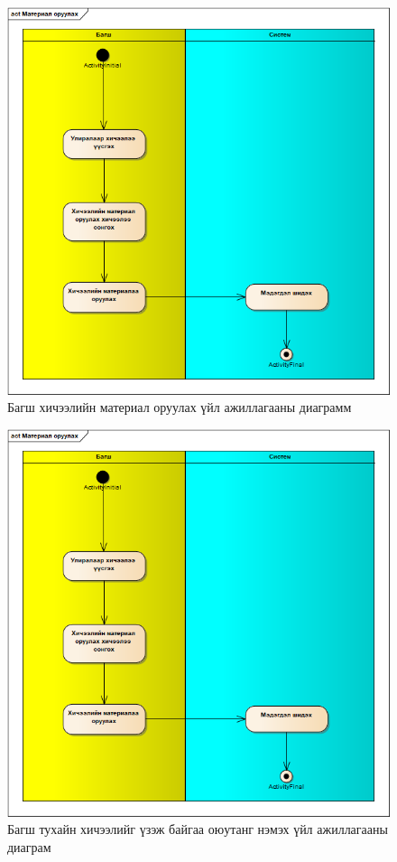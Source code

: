 \begin{figure}
	\centering
	\includegraphics[angle=90, scale=0.7]{Diagrams/activity}
	\caption[Багш хичээлийн материал оруулах үйл ажиллагааны диаграм]{Багш хичээлийн материал оруулах үйл ажиллагааны диаграмм}
	\label{text}
\end{figure}
\newpage
\begin{figure}
	
	\centering
	\includegraphics[angle=90, scale=0.75]{Diagrams/activity1}
	\caption[Багш тухайн хичээлийг үзэж байгаа оюутанг нэмэх үйл ажиллагааны диаграм]{Багш тухайн хичээлийг үзэж байгаа оюутанг нэмэх үйл ажиллагааны диаграм}
	\label{text}
\end{figure}

